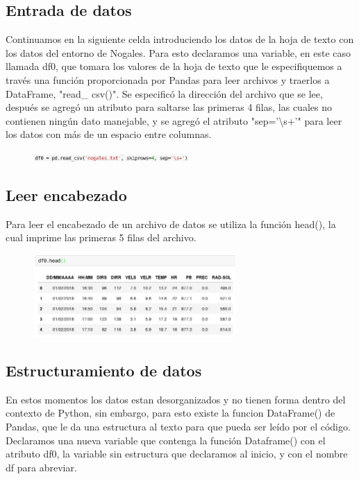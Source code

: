 \documentclass{article}
\begin{document}
\subsection{Entrada de datos}

Continuamos en la siguiente celda introduciendo los datos de la hoja de texto con los datos del entorno de Nogales. Para esto declaramos una variable, en este caso llamada df0, que tomara los valores de la hoja de texto que le especifiquemos a través una función proporcionada por Pandas para leer archivos y traerlos a DataFrame, "read\_ csv()". Se especificó la dirección del archivo que se lee, después se agregó un atributo para saltarse las primeras 4 filas, las cuales no contienen ningún dato manejable, y se agregó el atributo "sep='\textbackslash s+'" para leer los datos con más de un espacio entre columnas.
\begin{figure}[h]
\centering
\includegraphics[height=10px,width=224px]{2ndcell.png}
\end{figure}



\subsection{Leer encabezado}

Para leer el encabezado de un archivo de datos se utiliza la función head(), la cual imprime las primeras 5 filas del archivo.
\begin{figure}[h]
\centering
\includegraphics[height=119px,width=292px]{3rdcell.png}
\end{figure}

\subsection{Estructuramiento de datos}

En estos momentos los datos estan desorganizados y no tienen forma dentro del contexto de Python, sin embargo, para esto existe la funcion DataFrame() de Pandas, que le da una estructura al texto para que pueda ser leído por el código. Declaramos una nueva variable que contenga la función Dataframe() con el atributo df0, la variable sin estructura que declaramos al inicio, y con el nombre df para abreviar.
\end{document}
